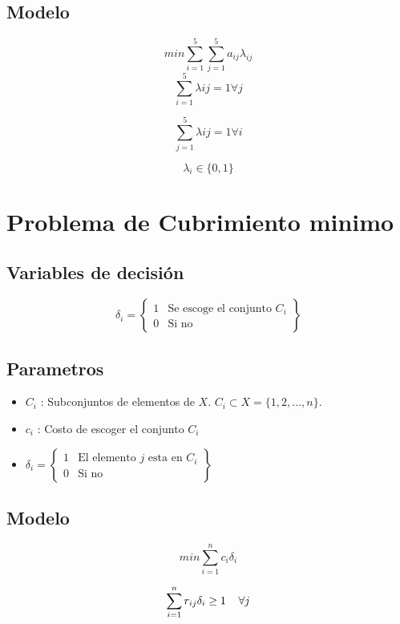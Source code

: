 \documentclass[]{article}
\begin{document}
{\subsection{Modelo}
$$min \sum_{i=1}^{5} \sum_{j=1}^{5} a_{ij} \lambda_{ij}$$
$$\sum_{i=1}^{5} \lambda{ij}  = 1 \forall j$$

$$\sum_{j=1}^{5} \lambda{ij} =  1 \forall i$$

$$ \lambda_i \in \{0,1\}$$


\section{Problema de Cubrimiento minimo}
\subsection{Variables de decisi\'on}

\begin{equation*}
\delta_{i} = 
 \left\{ \begin{array}{cl}
 1 & \mbox{Se escoge el conjunto $C_i$}\\
 0 & \mbox{Si no}
 \end{array} \right\}
\end{equation*}

\subsection {Parametros}



\begin{itemize}
	\item $C_i$ : Subconjuntos de elementos de $X$. $C_i \subset X = \{1,2,\dots , n \}$. 
	\item $c_i$ : Costo de escoger el conjunto $C_i$
	\item $\delta_{i} = 
	\left\{ \begin{array}{cl}
	1 & \mbox{El elemento $j$ esta en $C_i$}\\
	0 & \mbox{Si no}
	\end{array} \right\}$
\end{itemize}

\subsection{Modelo}

$$ min \sum_{i=1}^{n} c_i\delta_i$$

$$ \sum_{i=1}^{n} r_{ij} \delta_{i} \geq 1 \hspace{0.4cm} \forall j $$

}
\end{document}
